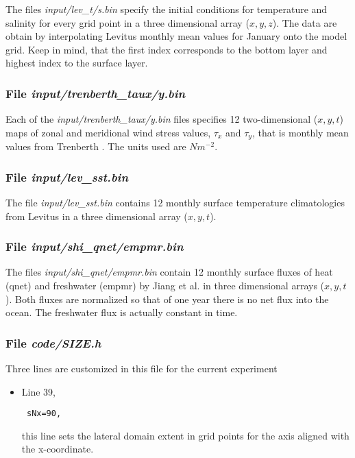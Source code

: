 {The files {\it input/lev\_t/s.bin} specify the initial conditions for
temperature and salinity for every grid point in a three dimensional
array ($x,y,z$). The data are obtain by interpolating Levitus
\cite{Levitus94} monthly mean values for January onto the model
grid. Keep in mind, that the first index corresponds to the bottom
layer and highest index to the surface layer.

\subsubsection{File {\it input/trenberth\_taux/y.bin}}
\label{www:tutorials}

Each of the {\it input/trenberth\_taux/y.bin} files specifies 12
two-dimensional ($x,y,t$) maps of zonal and meridional wind stress
values, $\tau_{x}$ and $\tau_{y}$, that is monthly mean values from
Trenberth \cite{trenberth90}. The units used are $Nm^{-2}$.

\subsubsection{File {\it input/lev\_sst.bin}}
\label{www:tutorials}

The file {\it input/lev\_sst.bin} contains 12 monthly surface
temperature climatologies from Levitus \cite{Levitus94} in a three
dimensional array ($x,y,t$).

\subsubsection{File {\it input/shi\_qnet/empmr.bin}}
\label{www:tutorials}

The files {\it input/shi\_qnet/empmr.bin} contain 12 monthly surface
fluxes of heat (qnet) and freshwater (empmr) by Jiang et al.
\cite{jiang99} in three dimensional arrays ($x,y,t$). Both fluxes are
normalized so that of one year there is no net flux into the
ocean. The freshwater flux is actually constant in time.

\subsubsection{File {\it code/SIZE.h}}
\label{www:tutorials}

Three lines are customized in this file for the current experiment

\begin{itemize}

\item Line 39, 
\begin{verbatim} sNx=90, \end{verbatim} this line sets
the lateral domain extent in grid points for the
axis aligned with the x-coordinate.


\end{itemize}}
